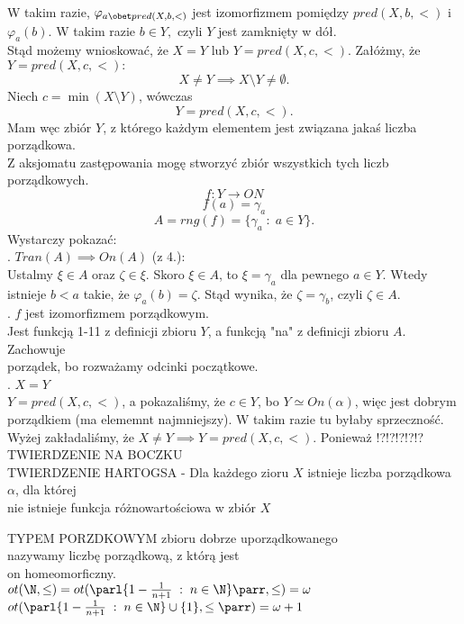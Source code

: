 W takim razie, $\varphi_{a \obet pred(X, b, <)}$ jest izomorfizmem pomiędzy $pred(X, b, <)$ i $\varphi_a(b)$. W takim razie $b\in Y,$ czyli $Y$ jest zamknięty w dół.\medskip\\
Stąd możemy wnioskować, że $X=Y$ lub $Y=pred(X, c, <)$. Załóżmy, że $Y=pred(X, c, <):$
$$X\neq Y\implies X\setminus Y\neq\emptyset.$$
Niech $c=\min(X\setminus Y)$, wówczas 
$$Y=pred(X, c, <).$$
Mam węc zbiór $Y$, z którego każdym elementem jest związana jakaś liczba porządkowa. \\Z aksjomatu zastępowania mogę stworzyć zbiór wszystkich tych liczb porządkowych.
$$f:Y\to ON$$
$$f(a)=\gamma_a$$
$$A=rng(f)=\{\gamma_a\;:\;a\in Y\}.$$
Wystarczy pokazać:\medskip\\
. $Tran(A)\implies On(A)$ (z 4.):\smallskip\\
Ustalmy $\xi\in A$ oraz $\zeta\in \xi$. Skoro $\xi\in A$, to $\xi=\gamma_a$ dla pewnego $a\in Y$. Wtedy istnieje $b<a$ takie, że $\varphi_a(b)=\zeta$. Stąd wynika, że $\zeta=\gamma_b$, czyli $\zeta\in A$.\medskip\\
. $f$ jest izomorfizmem porządkowym.\smallskip\\
Jest funkcją 1-11 z definicji zbioru $Y$, a funkcją "na" z definicji zbioru $A$. Zachowuje \\porządek, bo rozważamy odcinki początkowe.\medskip\\
. $X=Y$ \smallskip\\
$Y=pred(X, c, <)$, a {\color{emp}pokazaliśmy, że $c\in Y$, bo $Y\simeq On(\alpha)$, więc jest dobrym porządkiem (ma elememnt najmniejszy)}. W takim razie tu byłaby sprzeczność.\\
Wyżej zakładaliśmy, że $X\neq Y\implies Y=pred(X, c, <)$. Ponieważ !?!?!?!?!?
\kondow
{\color{dygresyja}TWIERDZENIE NA BOCZKU}\smallskip\\
{\color{acc}TWIERDZENIE HARTOGSA} - Dla każdego zioru $X$ istnieje liczba porządkowa $\alpha$, dla której \\nie istnieje funkcja różnowartościowa w zbiór $X$\bigskip\\
\bigskip
\begin{center}\large
    {\color{def}TYPEM PORZDKOWYM} zbioru dobrze uporządkowanego \\nazywamy liczbę porządkową, z którą jest \\on homeomorficzny.\smallskip\\
    $ot(\N,\leq)=ot(\parl\{1-\frac1{n+1}\;:\;n\in\N\}\parr,\leq)=\omega$\smallskip\\
    $ot (\parl\{1-\frac1{n+1}\;:\;n\in\N\}\cup\{1\},\leq\parr)=\omega+1$
\end{center}

